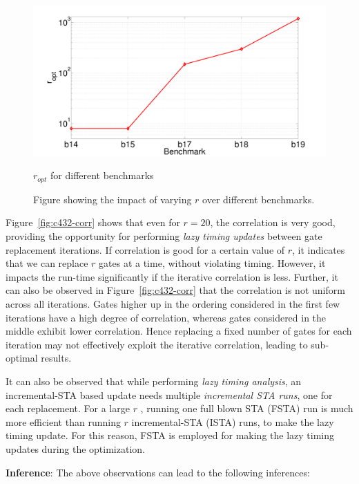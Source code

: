 \begin{figure}[t]
\begin{center}
\vspace{-0.2in}
\includegraphics[scale=0.2]{Chapter3/fig/ropt.pdf}
\end{center}
\caption{$r_{opt}$ for different benchmarks}
\label{fig:ropt}
\caption{Figure showing the impact of varying $r$ over different benchmarks.}
\end{figure}


\noindent Figure~\ref{fig:c432-corr} shows that even for $r=20$, the correlation is very good, providing the opportunity for performing {\it lazy timing updates} between gate replacement iterations. If correlation is good for a certain value of $r$, it indicates that we can replace $r$ gates at a time, without violating timing. However, it impacts the run-time significantly if the iterative correlation is less. Further, it can also be observed in Figure~\ref{fig:c432-corr} that the correlation is not uniform across all iterations. Gates higher up in the ordering considered in the first few iterations have a high degree of correlation, whereas gates considered in the middle exhibit lower correlation. Hence replacing a fixed number of gates for each iteration may not effectively 
exploit the iterative correlation, leading to sub-optimal results. 


\noindent It can also be observed that while performing {\em lazy timing analysis}, an incremental-STA based update needs multiple {\em incremental STA runs}, one for each replacement. For a large $r$ , running one full blown STA (FSTA) run is much more efficient than running $r$ incremental-STA (ISTA) runs, 
to make the lazy timing update. For this reason, FSTA is employed for making the lazy timing updates during the  optimization.

\noindent \textbf{Inference}: The above observations can lead to the following inferences:

